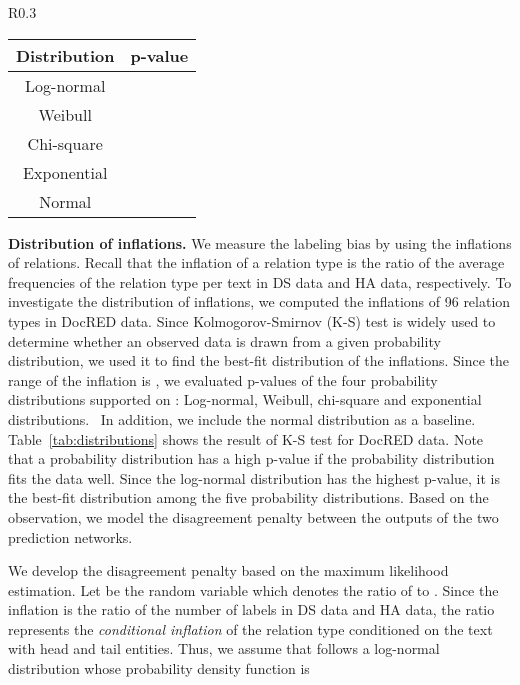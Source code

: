 \documentclass[11pt]{article}
\newcommand{\minisection}[1]{\vspace{0.03in}{\bf \noindent #1.} }
\begin{document}
\begin{wraptable}{R}{0.3\textwidth}
	\caption{The result of K-S test}
	\label{tab:distributions}
	\small
	\begin{tabular}{c|c}
		\toprule
		\textbf{Distribution}  & \textbf{p-value} \\
		\midrule
		Log-normal&{}\\
		Weibull &  \\
		Chi-square &  \\
		Exponential &  \\
		Normal& \\  
		\bottomrule
	\end{tabular}
\end{wraptable}
\noindent\textbf{Distribution of inflations.}
We measure the labeling bias by using the inflations of relations.
Recall that the inflation of a relation type is the ratio of the average frequencies of the relation type per text in DS data and HA data, respectively.
To investigate the distribution of inflations, we computed the inflations of 96 relation types in DocRED data.
Since Kolmogorov-Smirnov (K-S) test \cite{massey1951kolmogorov} is widely used to determine whether an observed data is drawn from a given probability distribution, we used it to find the best-fit distribution of the inflations.
Since the range of the inflation is , we evaluated p-values of the four probability distributions supported on  : Log-normal, Weibull, chi-square and exponential distributions. \
In addition, we include the normal distribution as a baseline.
Table~\ref{tab:distributions} shows the result of K-S test for DocRED data.
Note that a probability distribution has a high p-value if the probability distribution fits the data well.
Since the log-normal distribution has the highest p-value, it is the best-fit distribution among the five probability distributions.
Based on the observation, we model the disagreement penalty between the outputs of the two prediction networks. 



\minisection{Modeling the disagreement penalty}
We develop the disagreement penalty based on the maximum likelihood estimation.
Let  be the random variable which denotes the ratio of  to . 
Since the inflation is the ratio of the number of labels in DS data and HA data,
the ratio  represents the \emph{conditional inflation} of the relation type  conditioned on the text with head and tail entities.
Thus, we assume that  follows a log-normal distribution  whose probability density function is
\end{document}
